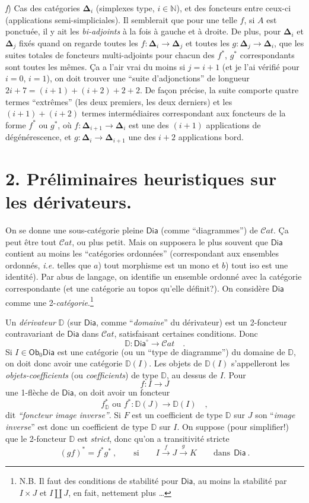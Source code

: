 \documentclass[11pt]{article}
\newcommand{\printedpage}[1]{\marginpar{\footnotesize p.~#1}}
\newcommand{\msp}[1]{\marginpar{\footnotesize [#1]}}
\newcommand{\Ob}{\mathsf{Ob}}
\newcommand{\bDelta}{\boldsymbol{\Delta}}
\newcommand{\Dia}{\mathsf{Dia}}
\newcommand{\Cat}{\mathcal{C}\mathit{at}}
\newcommand{\DD}{\mathbb{D}}
\begin{document}
\textit{f}) Cas des catégories $\bDelta_{i}$ (simplexes type, $i\in\mathbb{N}$), et des foncteurs entre ceux-ci (applications semi-simpliciales). Il semblerait que pour une telle $f$, si $A$ est ponctuée, il y ait les \textit{bi-adjoints} à la fois à gauche et à droite. De plus, pour $\bDelta_{i}$ et $\bDelta_{j}$ fixés quand on regarde toutes les $f:\bDelta_{i}\to\bDelta_{j}$ et toutes les $g:\bDelta_{j}\to\bDelta_{i}$, que les suites totales de foncteurs multi-adjoints pour chacun des $f^{*}$, $g^{*}$ correspondants sont toutes les mêmes. Ça a l'air vrai du moins si $j=i+1$ (et je l'ai vérifié pour $i=0$, $i=1$), on doit trouver une “suite d'adjonctions” de longueur $2i+7=(i+1)+(i+2)+2+2$. De façon précise, la suite comporte quatre termes “extrêmes” (les deux premiers, les deux derniers) et les $(i+1)+(i+2)$ termes intermédiaires correspondant aux foncteurs de la forme $f^{*}$ ou $g^{*}$, où $f:\bDelta_{i+1}\to\bDelta_{i}$ est une des $(i+1)$ applications de dégénérescence, et $g:\bDelta_{i}\to\bDelta_{i+1}$ une des $i+2$ applications bord.

\printedpage{4}

\msp{page 4}

\section*{2. Préliminaires heuristiques sur les dérivateurs.}

On se donne une sous-catégorie pleine $\Dia$ (comme “diagrammes”) de $\Cat$. Ça peut être tout $\Cat$, ou plus petit. Mais on supposera le plus souvent que $\Dia$ contient au moins les “catégories ordonnées” (correspondant aux ensembles ordonnés, \textit{i.e.} telles que $a$) tout morphisme est un mono et $b$) tout iso est une identité). Par abus de langage, on identifie un ensemble ordonné avec la catégorie correspondante (et une catégorie au topos qu'elle définit?). On considère $\Dia$ comme une 2-\textit{catégorie}.\footnote{N.B. Il faut des conditions de stabilité pour $\Dia$, au moins la stabilité par $I \times J$ et $I \amalg J$, en fait, nettement plus \dots}

Un \textit{dérivateur} $\DD$ (sur $\Dia$, comme “\textit{domaine}” du dérivateur) est un 2-foncteur contravariant de $\Dia$ dans $\Cat$, satisfaisant certaines conditions. Donc
\[ \DD : \Dia^{\circ} \longrightarrow \Cat \quad . \]
Si $I \in \Ob_0 \Dia$ est une catégorie (ou un “type de diagramme”) du domaine de $\DD$, on doit donc avoir une catégorie $\DD(I)$. Les objets de $\DD(I)$ s'appelleront les \textit{objets-coefficients} (ou \textit{coefficients}) de type $\DD$, au dessus de $I$. Pour
\[ f : I \longrightarrow J \]
une 1-flèche de $\Dia$, on doit avoir un foncteur
\[ f^*_{\DD} \text{ ou } f^* : \DD(J) \longrightarrow \DD(I) \quad , \]
dit \textit{“foncteur image inverse”}. Si $F$ est un coefficient de type $\DD$ sur $J$ son “\textit{image inverse}” est donc un coefficient de type $\DD$ sur $I$. On suppose (pour simplifier!) que le 2-foncteur $\DD$ est \textit{strict}, donc qu'on a transitivité stricte
\[ (gf)^* = f^*g^* \ , \qquad \text{si} \qquad I \xrightarrow{f} J \xrightarrow{g} K \qquad \text{dans} \ \ \Dia \ . \]
\end{document}

